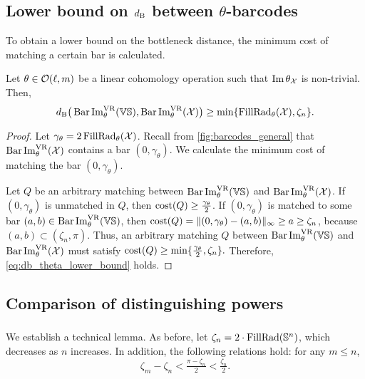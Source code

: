 \subsection{Lower bound on $d_{\mathrm{B}}$ between $\theta$-barcodes}
\label{subsub:db_theta_lower_bound}

To obtain a lower bound on the bottleneck distance, the minimum cost of matching a certain bar is calculated.

\medskip\proposition
Let $\theta \in \mathcal{O}(\ell, m)$ be a linear cohomology operation such that $\operatorname{Im} \theta_{\mathcal{X}}$ is non-trivial.
Then,
\begin{equation}\label{eq:db_theta_lower_bound}
	\db\big(\thetabarc{\VS}, \thetabarc{\cX}\big)
	\geq \min\{\firstdeath{\theta}{\cX}, \zeta_n\}. %
\end{equation}

\begin{proof}
    Let $\gamma_\theta = 2\operatorname{FillRad}_{\theta}(\mathcal{X})$.
	Recall from \cref{fig:barcodes_general} that $\operatorname{Bar}\operatorname{Im}_{\theta}^{\mathrm{VR}} (\mathcal{X})$ contains a bar $(0,\gamma_\theta)$.
	We calculate the minimum cost of matching the bar $(0,\gamma_\theta)$.

	Let $Q$ be an arbitrary matching between $\operatorname{Bar}\operatorname{Im}_{\theta}^{\mathrm{VR}} (\mathbb{V}\mathbb{S})$ and $\operatorname{Bar}\operatorname{Im}_{\theta}^{\mathrm{VR}} (\mathcal{X})$.
	If $(0,\gamma_\theta )$ is unmatched in $Q$, then $\mathrm{cost}(Q) \geq \tfrac{\gamma_\theta }{2}$.
	If $(0,\gamma_\theta )$ is matched to some bar $(a,b) \in \operatorname{Bar}\operatorname{Im}_{\theta}^{\mathrm{VR}} (\mathbb{V}\mathbb{S})$, then
	$\mathrm{cost}(Q) =  \|(0,\gamma_\theta ) - (a,b)\|_\infty \geq a \geq \zeta_n$, because $(a,b) \subset (\zeta_n, \pi)$.
	Thus, an arbitrary matching $Q$ between $\operatorname{Bar}\operatorname{Im}_{\theta}^{\mathrm{VR}} (\mathbb{V}\mathbb{S})$ and $\operatorname{Bar}\operatorname{Im}_{\theta}^{\mathrm{VR}} (\mathcal{X})$ must satisfy $\mathrm{cost}(Q) \geq \min\{\tfrac{\gamma_\theta }{2}, \zeta_n\}.$
	Therefore, \cref{eq:db_theta_lower_bound} holds.
\end{proof}

\subsection{Comparison of distinguishing powers}
\label{subsub:main_theorem}

\subsubsection{}
\label{subsub:comparison_lemma}

We establish a technical lemma.
As before, let $\zeta_n = 2 \cdot \operatorname{FillRad}(\mathbb{S}^n)$, which decreases as $n$ increases.
In addition, the following relations hold: for any $m \leq n$,
\[\zeta_m - \zeta_n < \tfrac{\pi - \zeta_n}{2} < \tfrac{\zeta_n}{2}.\]

